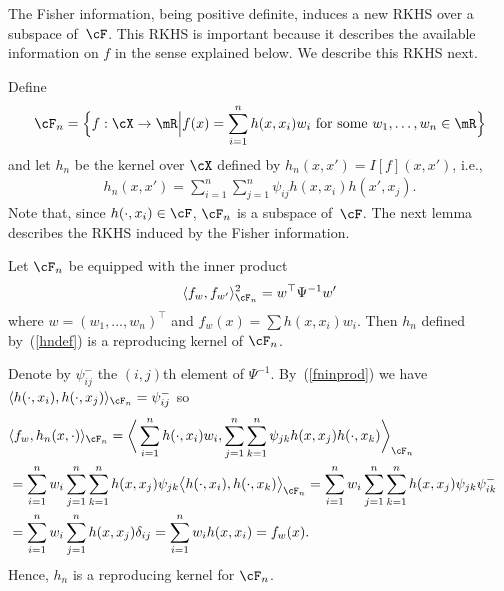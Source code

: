 \documentclass[preprint,12pt,authoryear]{elsarticle}
\DeclarePairedDelimiter{\norm}{\lVert}{\rVert}
\def\half{{\scriptstyle\frac{1}{2}}}
\begin{document}
The Fisher information, being positive definite, induces a new RKHS over a subspace of~$\cF$. This RKHS is important because it describes the available information on $f$ in the sense explained below. We describe this RKHS next. 

Define
\begin{eqnarray}\label{fndef}
\cF_n = \Big\{ f:\cX\rightarrow\mR \Big| f(x) = \sum_{i=1}^n h(x,x_i)w_i \mbox{ for some $w_1,\ldots,w_n\in\mR$} \Big\}
\end{eqnarray}
and let $h_n$ be the kernel over $\cX$ defined by $h_n(x,x')=I[f](x,x')$, i.e.,
\begin{align}\label{hndef}
h_n(x,x') = \sum_{i=1}^n\sum_{j=1}^n \psi_{ij}h(x,x_i)h(x',x_j).
\end{align}
Note that, since $h(\cdot,x_i)\in\cF$, $\cF_n$ is a subspace of~$\cF$.
The next lemma describes the RKHS induced by the Fisher information.
\begin{lemma}\label{lem-f2}
	Let $\cF_n$ be equipped with the inner product
	\begin{equation}\label{fninprod}  \langle f_w,f_{w'}\rangle_{\cF_n}^2 = w^\top\Psi^{-1}w' \end{equation}
	where $w=(w_1,\ldots,w_n)^\top$ and $f_w(x)=\sum h(x,x_i)w_i$.
	Then $h_n$ defined by~(\ref{hndef}) is a reproducing kernel of $\cF_n$.
\end{lemma}
\noindent\proof[Proof]
Denote by $\psi_{ij}^-$ the $(i,j)$th element of $\Psi^{-1}$. By~(\ref{fninprod}) we have $\langle h(\cdot,x_i), h(\cdot,x_j) \rangle_{\cF_n}=\psi_{ij}^-$ so
\begin{align*}
\lefteqn{
	\langle f_w, h_n(x,\cdot) \rangle_{\cF_n}
	= \bigg\langle \sum_{i=1}^n h(\cdot,x_i)w_i, \sum_{j=1}^n\sum_{k=1}^n \psi_{jk} h(x,x_j)h(\cdot,x_k) \bigg\rangle_{\cF_n} }\\
&= \sum_{i=1}^n w_i \sum_{j=1}^n\sum_{k=1}^n h(x,x_j)\psi_{jk}\big\langle h(\cdot,x_i), h(\cdot,x_k) \big\rangle_{\cF_n} 
= \sum_{i=1}^n w_i \sum_{j=1}^n\sum_{k=1}^n h(x,x_j)\psi_{jk}\psi_{ik}^- \\
&= \sum_{i=1}^n w_i \sum_{j=1}^n h(x,x_j)\delta_{ij}
= \sum_{i=1}^n w_i h(x,x_i) = f_w(x).
\end{align*}
Hence, $h_n$ is a reproducing kernel for $\cF_n$.
\endproof


\end{document}
